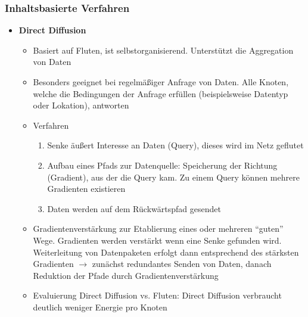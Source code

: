 \subsubsection{Inhaltsbasierte Verfahren}
\begin{itemize}
	\item \textbf{Direct Diffusion}
	\begin{itemize}
		\item Basiert auf Fluten, ist selbstorganisierend. Unterstützt die Aggregation von Daten
		\item Besonders geeignet bei regelmäßiger Anfrage von Daten. Alle Knoten, welche die Bedingungen der Anfrage erfüllen (beispielsweise Datentyp oder Lokation), antworten
		\item Verfahren
		\begin{enumerate}
			\item Senke äußert Interesse an Daten (Query), dieses wird im Netz geflutet
			\item Aufbau eines Pfads zur Datenquelle: Speicherung der Richtung (Gradient), aus der die Query kam. Zu einem Query können mehrere Gradienten existieren
			\item Daten werden auf dem Rückwärtspfad gesendet
		\end{enumerate}
		\item Gradientenverstärkung zur Etablierung eines oder mehreren "`guten"' Wege. Gradienten werden verstärkt wenn eine Senke gefunden wird. Weiterleitung von Datenpaketen erfolgt dann entsprechend des stärksten Gradienten \(\rightarrow\) zunächst redundantes Senden von Daten, danach Reduktion der Pfade durch Gradientenverstärkung
		\item Evaluierung Direct Diffusion vs. Fluten: Direct Diffusion verbraucht deutlich weniger Energie pro Knoten
	\end{itemize}
\end{itemize}

